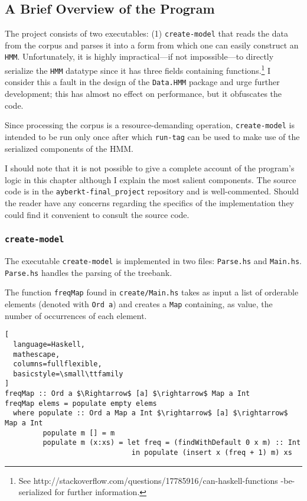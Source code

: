 \documentclass{article}
\begin{document}
\subsection{A Brief Overview of the Program}

The project consists of two executables: (1) \texttt{create-model} that reads
the data from the corpus and parses it into a form from which one can easily
construct an \texttt{HMM}. Unfortunately, it is highly impractical---if not
impossible---to directly serialize the \texttt{HMM} datatype since it has three
fields containing functions.\footnote{See
  http://stackoverflow.com/questions/17785916/can-haskell-functions
  -be-serialized for further information.} I consider this a fault in the
design of the \texttt{Data.HMM} package and urge further development; this has
almost no effect on performance, but it obfuscates the code.

Since processing the corpus is a resource-demanding operation,
\texttt{create-model} is intended to be run only once after which
\texttt{run-tag} can be used to make use of the serialized components of the
HMM.

I should note that it is not possible to give a complete account of the
program's logic in this chapter although I explain the most salient components.
The source code is in the \texttt{ayberkt-final\_project} repository and is
well-commented. Should the reader have any concerns regarding the specifics of
the implementation they could find it convenient to consult the source code.

\subsubsection{\texttt{create-model}}

The executable \texttt{create-model} is implemented in two files:
\texttt{Parse.hs} and \texttt{Main.hs}. \texttt{Parse.hs} handles the parsing of
the treebank.

The function \texttt{freqMap} found in \texttt{create/Main.hs} takes as input a
list of orderable elements (denoted with \texttt{Ord a}) and creates a
\texttt{Map} containing, as value, the number of occurrences of each element.

\begin{lstlisting}[
  language=Haskell,
  mathescape,
  columns=fullflexible,
  basicstyle=\small\ttfamily
]
freqMap :: Ord a $\Rightarrow$ [a] $\rightarrow$ Map a Int
freqMap elems = populate empty elems
  where populate :: Ord a Map a Int $\rightarrow$ [a] $\rightarrow$ Map a Int
         populate m [] = m
         populate m (x:xs) = let freq = (findWithDefault 0 x m) :: Int
                              in populate (insert x (freq + 1) m) xs
\end{lstlisting}
\end{document}
